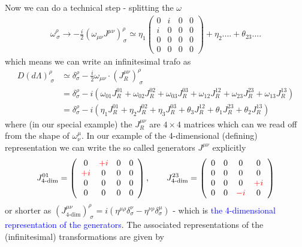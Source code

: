 \documentclass[10pt,a4paper]{report}
\theoremstyle{definition}
\begin{document}
Now we can do a technical step - splitting the $\omega$
\begin{align}
\omega^\rho_{\,\sigma}\rightarrow -\frac{i}{2}(\omega_{\mu\nu} J^{\mu\nu})^\rho_{\,\sigma}\simeq
\eta_1\left(\begin{matrix}
0&i&0&0\\
i&0&0&0\\
0&0&0&0\\
0&0&0&0
\end{matrix}
\right)+\eta_2....+\theta_{23}....
\end{align}
which means we can write an infinitesimal trafo as
\begin{align}
D(d\Lambda)^\rho_{\;\sigma}&\simeq \delta^\rho_\sigma-\frac{i}{2}\omega_{\mu\nu}\cdot(J_R^{\mu\nu})^\rho_{\;\sigma}\\
&=\delta^\rho_\sigma-i(\omega_{01}J_R^{01}+\omega_{02}J_R^{02}+\omega_{03}J_R^{03}+\omega_{12}J_R^{12}+\omega_{23}J_R^{23}+\omega_{13}J_R^{13})\\
&=\delta^\rho_\sigma-i(\eta_1 J_R^{01}+\eta_2 J_R^{02}+\eta_3 J_R^{03}+\theta_3 J_R^{12}+\theta_1J_R^{23}+\theta_2 J_R^{13})
\end{align}
where (in our special example) the $J^{\mu\nu}_R$ are $4\times4$ matrices which can we read off from the shape of $\omega^\mu_\nu$.
In our example of the 4-dimensional (defining) representation we can write the so called generators $J^{\mu\nu}$ explicitly
\begin{align}J^{01}_\text{4-dim}=\left(
\begin{array}{cccc}
 0  &  \textcolor{red}{+i} &  0 &  0\\
\textcolor{red}{+i}  &  0 &  0 &  0\\
 0  &  0 &  0 &  0\\
 0  &  0 &  0 &  0
\end{array}
\right),\qquad
J^{23}_\text{4-dim}=\left(
\begin{array}{cccc}
0  &  0 &  0 &  0\\
0  &  0 &  0 &  0\\
0  &  0 &  0 &  \textcolor{red}{+i}\\
0  &  0 & \textcolor{red}{-i} &  0
\end{array}
\right)
\end{align}
or shorter as $(J_\text{4-dim}^{\mu\nu})^\rho_{\;\sigma}=i(\eta^{\mu\rho}\delta^\nu_\sigma-\eta^{\nu\rho}\delta^\mu_\sigma)$ - which is \textcolor{blue}{the 4-dimensional representation of the generators}.
The associated representations of the (infinitesimal) transformations are given by
\end{document}
